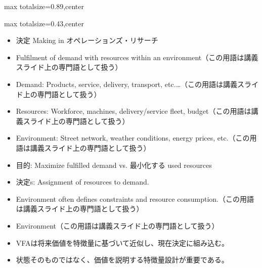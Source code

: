 \begin{minipage}[t]{0.58\textwidth}
\begin{adjustbox}{max totalsize={\textwidth}{0.89\textheight},center}
\begin{minipage}{\textwidth}
\end{minipage}
\end{adjustbox}
\end{minipage}


\clearpage
{}
\begin{minipage}[t]{0.405\textwidth}
\begin{adjustbox}{max totalsize={\textwidth}{0.43\textheight},center}
\begin{minipage}{\textwidth}\scriptsize
{}\begin{itemize}
\item 決定 Making in オペレーションズ・リサーチ
\item Fulfilment of demand with resources within an environment（この用語は講義スライド上の専門語として扱う）
\item Demand: Products, service, delivery, transport, etc.…（この用語は講義スライド上の専門語として扱う）
\item Resources: Workforce, machines, delivery/service fleet, budget（この用語は講義スライド上の専門語として扱う）
\item Environment: Street network, weather conditions, energy prices, etc.（この用語は講義スライド上の専門語として扱う）
\item 目的: Maximize fulfilled demand vs. 最小化する used resources
\item 決定s: Assignment of resources to demand.
\item Environment often defines constraints and resource consumption.（この用語は講義スライド上の専門語として扱う）
\item Environment（この用語は講義スライド上の専門語として扱う）
\end{itemize}\begin{itemize}
\item VFAは将来価値を特徴量に基づいて近似し、現在決定に組み込む。
\item 状態そのものではなく、価値を説明する特徴量設計が重要である。
\end{itemize}
\end{minipage}
\end{adjustbox}
\end{minipage}\hfill
